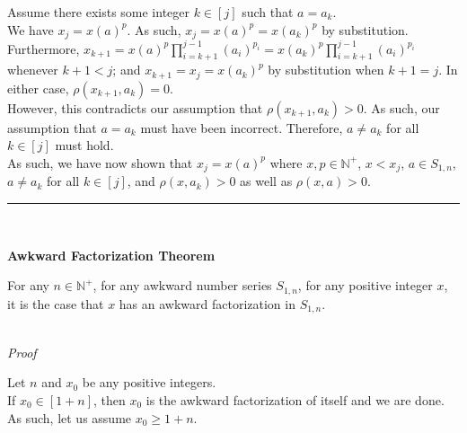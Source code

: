 \documentclass[a4paper,12pt]{article}
\begin{document}
\noindent Assume there exists some integer $k \in [j]$ such that $a = a_k$.\\

\noindent We have $x_j = x(a)^p$. As such, $x_j = x(a)^p = x(a_k)^p$ by substitution.\\

\noindent Furthermore, $\displaystyle x_{k + 1} = x(a)^p \prod_{i = k + 1}^{j - 1} (a_i)^{p_i} = x(a_k)^p \prod_{i = k + 1}^{j - 1} (a_i)^{p_i}$ whenever $k + 1 < j$; and $x_{k + 1} = x_j = x(a_k)^p$ by substitution when $k + 1 = j$. In either case, $\rho(x_{k + 1}, a_k) = 0$.\\

\noindent However, this contradicts our assumption that $\rho(x_{k + 1}, a_k) > 0$. As such, our assumption that $a = a_k$ must have been incorrect. Therefore, $a \neq a_k$ for all $k \in [j]$ must hold.\\

\noindent As such, we have now shown that $x_j = x(a)^p$ where $x, p \in \mathbb{N}^+$, $x < x_j$, $a \in S_{1, n}$, $a \neq a_k$ for all $k \in [j]$, and $\rho(x, a_k) > 0$ as well as $\rho(x, a) > 0$.

\begin{center}
\noindent\rule{8cm}{0.4pt}
\end{center}
\noindent \\









\label{thereom:awkward_factorization}
\hypertarget{thereom:awkward_factorization}{}
\begin{tcolorbox}
\textbf{Awkward Factorization Theorem}

For any $n \in \mathbb{N}^+$, for any awkward number series $S_{1,n}$, for any positive integer $x$, it is the case that $x$ has an awkward factorization in $S_{1, n}$.
\end{tcolorbox}


\noindent \\
\textit{Proof}

\noindent Let $n$ and $x_0$ be any positive integers.\\

\noindent If $x_0 \in [1 + n]$, then $x_0$ is the awkward factorization of itself and we are done.\\

\noindent As such, let us assume $x_0 \geq 1 + n$.\\
\end{document}
